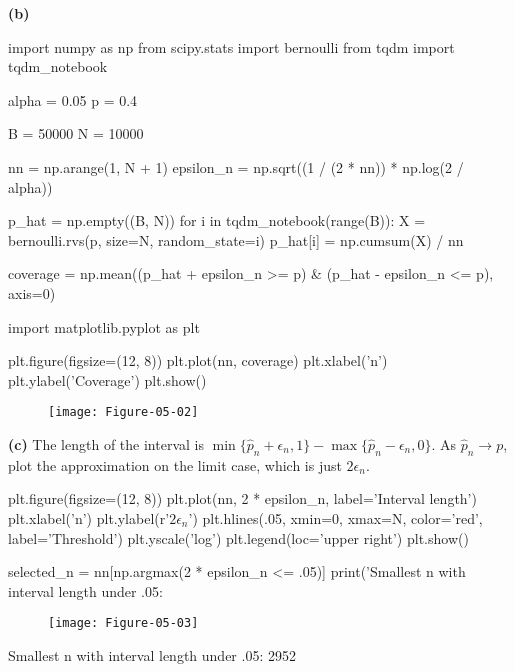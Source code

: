 \textbf{(b)}

\begin{python}
import numpy as np
from scipy.stats import bernoulli
from tqdm import tqdm_{n}otebook

alpha = 0.05
p = 0.4

B = 50000
N = 10000

nn = np.arange(1, N + 1)
epsilon_{n} = np.sqrt((1 / (2 * nn)) * np.log(2 / alpha))

p_hat = np.empty((B, N))
for i in tqdm_{n}otebook(range(B)):
    X = bernoulli.rvs(p, size=N, random_state=i)
    p_hat[i] = np.cumsum(X) / nn

coverage = np.mean((p_hat + epsilon_{n} >= p) & (p_hat - epsilon_{n} <= p), axis=0)
\end{python}

\begin{python}
import matplotlib.pyplot as plt

plt.figure(figsize=(12, 8))
plt.plot(nn, coverage)
plt.xlabel('n')
plt.ylabel('Coverage')
plt.show()
\end{python}

\begin{figure}[H]
\centering
\texttt{[image: Figure-05-02]}
\end{figure}

\textbf{(c)} The length of the interval is
\(\min \{\hat{p}_{n} + \epsilon_{n}, 1 \} - \max \{ \hat{p}_{n} - \epsilon_{n}, 0\}\).
As \(\hat{p}_{n} \rightarrow p\),  plot the approximation on the
limit case, which is just \(2 \epsilon_{n}\).

\begin{python}
plt.figure(figsize=(12, 8))
plt.plot(nn, 2 * epsilon_{n}, label='Interval length')
plt.xlabel('n')
plt.ylabel(r'$2\epsilon_{n}$')
plt.hlines(.05, xmin=0, xmax=N, color='red', label='Threshold')
plt.yscale('log')
plt.legend(loc='upper right')
plt.show()

selected_{n} = nn[np.argmax(2 * epsilon_{n} <= .05)]
print('Smallest n with interval length under .05: %
\end{python}

\begin{figure}[H]
\centering
\texttt{[image: Figure-05-03]}
\end{figure}

\begin{console}
Smallest n with interval length under .05: 2952
\end{console}
